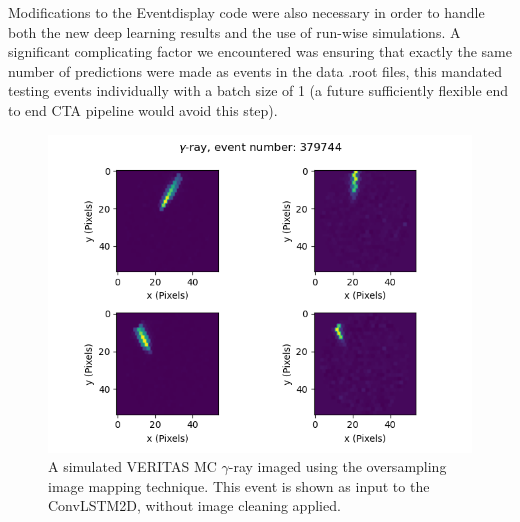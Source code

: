 Modifications to the Eventdisplay code were also necessary in order to handle both the new deep learning results and the use of run-wise simulations. A significant complicating factor we encountered was ensuring that exactly the same number of predictions were made as events in the data .root files, this mandated testing events individually with a batch size of 1 (a future sufficiently flexible end to end CTA pipeline would avoid this step). 
\begin{figure}[] 
        \centering \includegraphics[width=0.8\columnwidth]{figures/event_22_oversampling.png}

        \caption{
                \label{fig:Gamex} A simulated VERITAS MC $\gamma$-ray imaged using the oversampling image mapping technique. This event is shown as input to the ConvLSTM2D, without image cleaning applied.
        }
\end{figure}

